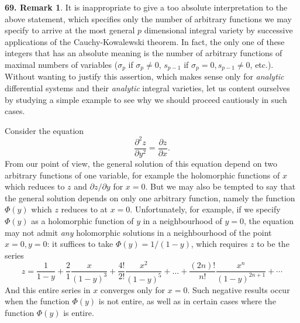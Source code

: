\documentclass[leqno,11pt]{book}
\numberwithin{equation}{chapter}
\newcommand{\pd}{\partial}
\theoremstyle{shape1}
\theoremstyle{shape0}
\theoremstyle{shape2}
\theoremstyle{definition}
\begin{document}
\vspace{12pt}\addtocounter{frenchsec}{1}
\theoremstyle{shape0}
\newtheorem*{rmk69}{\hspace{15pt}\textbf{69.} Remark}
\begin{rmk69}
  It is inappropriate to give a too absolute interpretation  to the above statement, which specifies only the number of arbitrary functions we may specify to arrive at the most general $p$ dimensional integral variety by successive applications of the Cauchy-Kowalewski theorem. In fact, the only one of these integers that has an absolute meaning is the number of arbitrary functions of maximal numbers of variables ($\sigma_{p}$ if $\sigma_{p}\neq 0$, $s_{p-1}$ if $\sigma_{p}=0, s_{p-1}\neq 0$, {etc}.). Without wanting to justify this assertion, which  makes sense  only for \emph{analytic} differential systems and their \emph{analytic} integral varieties, let us content ourselves by studying a simple example to see why  we should proceed cautiously in such cases.

Consider the equation
\[
\frac{\pd^{2}z}{\pd y^{2}}=\frac{\pd z}{\pd x}.
\]
From our point of view, the general solution of this equation depend on two arbitrary functions of one variable, for example the holomorphic functions of $x$ which reduces to $z$ and $\pd z/\pd y$ for $x=0$. But we may also be tempted to say that the general solution depends on only one arbitrary function, namely the function $\Phi(y)$ which  $z$ reduces to at $x=0$. Unfortunately, for example, if we specify $\Phi(y)$ as a holomorphic function of $y$ in a neighbourhood of $y=0$, the equation may not admit \emph{any} holomorphic solutions in a neighbourhood of the point $x=0, y=0$: it suffices to take $\Phi(y)=1/(1-y)$, which requires $z$ to be the series
\[
z=\frac{1}{1-y}+\frac{2}{1}\frac{x}{(1-y)^{3}}+\frac{4!}{2!}\frac{x^{2}}{(1-y)^{5}}+\dots+\frac{(2n)!}{n!}\frac{x^{n}}{(1-y)^{2n+1}}+\cdots
\]
And this entire series in $x$ converges only for $x=0$. Such negative results occur when the function $\Phi(y)$ is not entire, as well as in certain cases where the function $\Phi(y)$ is entire.
\end{rmk69}
\end{document}
